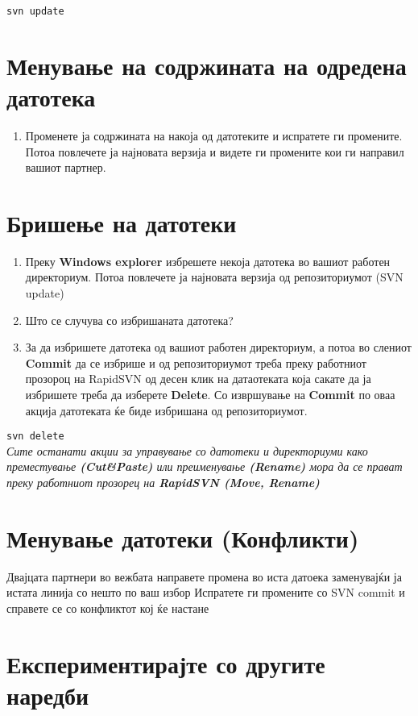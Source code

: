 \documentclass[12pt,a4paper]{exam}
\begin{document}
\texttt{svn update}

\section{Менување на содржината на одредена датотека}
\begin{enumerate}
  \item Променете ја содржината на накоја од датотеките и испратете ги
  промените. Потоа повлечете ја најновата верзија и видете ги промените кои ги
  направил вашиот партнер.
\end{enumerate}
   
\section{Бришење на датотеки}

\begin{enumerate}
  \item Преку \textbf{Windows explorer} избрешете некоја датотека во вашиот
  работен директориум. Потоа повлечете ја најновата верзија од репозиториумот
  (SVN update)
  \item Што се случува со избришаната датотека?
  \item За да избришете датотека од вашиот работен директориум, а потоа во слениот
  \textbf{Commit} да се избрише и од репозиториумот треба преку работниот
  прозороц на RapidSVN од десен клик на датаотеката која сакате да ја избришете
  треба да изберете \textbf{Delete}. Со извршување на \textbf{Commit} по оваа акција
  датотеката ќе биде избришана од репозиториумот.
\end{enumerate}
 
\texttt{svn delete}\\

\emph{Сите останати акции за управување со датотеки и директориуми како
преместување \textbf{(Cut\&Paste)} или преименување \textbf{(Rename)} мора да се прават преку работниот
прозорец на \textbf{RapidSVN (Move, Rename)}}

\section{Менување датотеки (Конфликти)}

 Двајцата партнери во вежбата направете промена во иста датоека заменувајќи ја истата линија со нешто по ваш избор
  Испратете ги промените со SVN commit и справете се со конфликтот кој ќе
 настане

\section{Експериментирајте со другите наредби}
\end{document}
